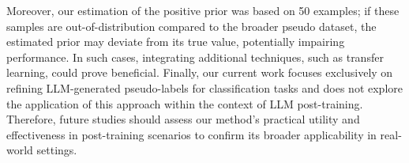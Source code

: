 Moreover, our estimation of the positive prior was based on 50 examples; if these samples are out-of-distribution compared to the broader pseudo dataset, the estimated prior may deviate from its true value, potentially impairing performance. In such cases, integrating additional techniques, such as transfer learning, could prove beneficial. Finally, our current work focuses exclusively on refining LLM-generated pseudo-labels for classification tasks and does not explore the application of this approach within the context of LLM post-training. Therefore, future studies should assess our method’s practical utility and effectiveness in post-training scenarios to confirm its broader applicability in real-world settings.
